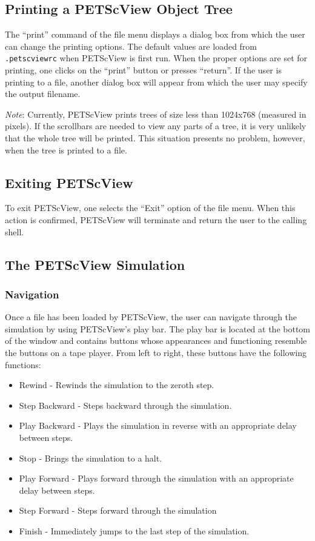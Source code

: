 {\subsection{Printing a PETScView Object Tree}

The ``print'' command of the file menu displays a dialog box from
which the user can change the printing options.  The default values
are loaded from {\tt .petscviewrc} when PETScView is first run.  When
the proper options are set for printing, one clicks on the ``print''
button or presses ``return''.  If the user is printing to a file,
another dialog box will appear from which the user may specify the
output filename.

{\em Note}:  Currently, PETScView  prints trees of size less
than 1024x768 (measured in pixels).  If the scrollbars are needed to
view any parts of a tree, it is very unlikely that the whole tree will
be printed.  This situation presents no problem, however, when the tree is
printed to a file.

\subsection{Exiting PETScView}

To exit PETScView, one selects the ``Exit'' option of the file
menu.  When this action is confirmed, PETScView will terminate
and return the user to the calling shell.

\subsection{The PETScView Simulation}

\subsubsection{Navigation}

Once a file has been loaded by PETScView, the user can navigate
through the simulation by using PETScView's play bar.  The play
bar is located at the bottom of the window and contains buttons whose
appearances and functioning resemble the buttons on a tape player.
From left to right, these buttons have the following functions:
\begin{itemize}
\item Rewind - Rewinds the simulation to the zeroth step.
\item Step Backward - Steps backward through the simulation.
\item Play Backward - Plays the simulation in reverse with an appropriate delay between steps.  
\item Stop - Brings the simulation to a halt.
\item Play Forward - Plays forward through the simulation with an appropriate delay between steps.
\item Step Forward - Steps forward through the simulation
\item Finish - Immediately jumps to the last step of the simulation.
\end{itemize}

}
